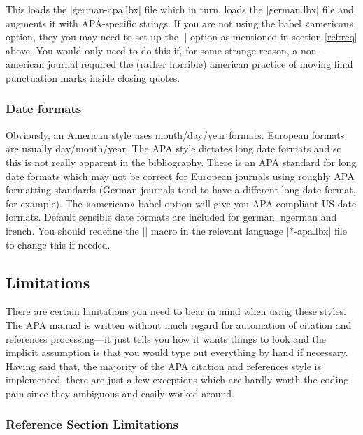 \documentclass{ltxdockit}
\begin{document}
\begin{ltxcode}
\end{ltxcode}

This loads the |german-apa.lbx| file which in turn, loads the |german.lbx|
file and augments it with APA-specific strings. If you are not using the
babel «american» option, they you may need to set up the
|\DeclareQuotePunctuation| option as mentioned in section \ref{ref:req} above.
You would only need to do this if, for some strange reason, a non-american
journal required the (rather horrible) american practice of moving final
punctuation marks inside closing quotes.

\subsubsection{Date formats}

Obviously, an American style uses month/day/year formats. European formats
are usually day/month/year. The APA style dictates long date formats and so
this is not really apparent in the bibliography. There is an APA standard
for long date formats which may not be correct for European journals using
roughly APA formatting standards (German journals tend to have a different
long date format, for example). The «american» babel option will give you
APA compliant US date formats. Default sensible date formats are included
for german, ngerman and french. You should redefine the |\mkbibdatelong|
macro in the relevant language |*-apa.lbx| file to change this if needed.

\subsection{Limitations}
\label{use:limit}
There are certain limitations you need to bear in mind when using these
styles. The APA manual is written without much regard for automation of
citation and references processing---it just tells you how it wants things to
look and the implicit assumption is that you would type out everything by
hand if necessary. Having said that, the majority of the APA citation
and references style is implemented, there are just a few exceptions which
are hardly worth the coding pain since they ambiguous and easily worked
around.

\subsubsection{Reference Section Limitations}
\end{document}
